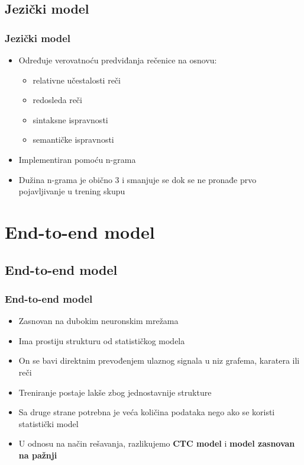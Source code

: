 \documentclass{beamer}
\begin{document}
\subsection{Jezički model}
\begin{frame}
  \frametitle{Jezički model}

  \begin{itemize}
    \item Određuje verovatnoću predviđanja rečenice na osnovu:
    \begin{itemize}
      \item relativne učestalosti reči
      \item redosleda reči
      \item sintaksne ispravnosti
      \item semantičke ispravnosti
    \end{itemize}
    \item Implementiran pomoću n-grama
    \item Dužina n-grama je obično 3 i smanjuje se dok se ne pronađe prvo pojavljivanje u trening skupu
  \end{itemize}
\end{frame}

\section{End-to-end model}
\subsection{End-to-end model}
\begin{frame}
  \frametitle{End-to-end model}
  \begin{itemize}
    \item Zasnovan na dubokim neuronskim mrežama 
    \item Ima prostiju strukturu od statističkog modela
    \item On se bavi direktnim prevođenjem ulaznog signala u niz grafema, karatera ili reči
    \item Treniranje postaje lakše zbog jednostavnije strukture
    \item Sa druge strane potrebna je veća količina podataka nego ako se koristi statistički model
    \item U odnosu na način rešavanja, razlikujemo \textbf{CTC model} \cite{graves2006ctc} i \textbf{model zasnovan na pažnji} \cite{chorowski2015attentionbased}
  \end{itemize} 
\end{frame}
\end{document}
